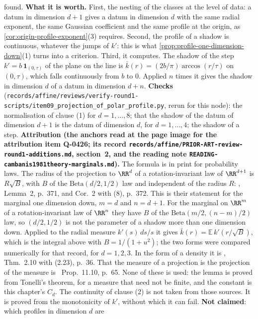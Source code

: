 \begin{lemma}
{found. \textbf{What it is worth.} First, the nesting of the classes at the level of data: a datum
in dimension $d + 1$ gives a datum in dimension $d$ with the same radial exponent, the same
Gaussian coefficient and the same profile at the origin, as
\ref{cor:origin-profile-exponent}(3) requires. Second, the profile of a shadow is continuous,
whatever the jumps of $k'$: this is what \ref{prop:profile-one-dimension-down}(1) turns into a
criterion. Third, it computes. The shadow of the step $k' = b\,\mathbf 1_{(0,\tau)}$ of the plane
on the line is $\bar k(r) = (2b/\pi)\arccos(r/\tau)$ on $(0,\tau)$, which falls continuously from
$b$ to $0$. Applied $n$ times it gives the shadow in dimension $d$ of a datum in dimension
$d + n$. \textbf{Checks}
(\texttt{records/affine/reviews/verify-round1-scripts/item09\_projection\_of\_polar\_profile.py},
rerun for this node): the normalisation of clause (1) for $d = 1,\dots,8$; that the shadow of the
\Matern{} datum of dimension $d + 1$ is the \Matern{} datum of dimension $d$, for
$d = 1,\dots,4$; the shadow of a step. \textbf{Attribution (the anchors read at the page image
for the attribution item Q-0426; its record
\texttt{records/affine/PRIOR-ART-review-round1-additions.md}, section~2, and the reading note
\texttt{READING-cambanis1981theory-marginals.md}).} The formula is in print for
probability laws. The radius of the projection to $\RR^d$ of a rotation-invariant law of
$\RR^{d+1}$ is $R\sqrt{B}$, with $B$ of the $\mathrm{Beta}(d/2, 1/2)$ law and independent of the
radius $R$: , Lemma~2, p.~371, and Cor.~2 with (8), p.~372. This is
their statement for the marginal one dimension down, $m = d$ and $n = d + 1$. For the marginal
on $\RR^m$ of a rotation-invariant law of $\RR^n$ they have $B$ of the
$\mathrm{Beta}(m/2, (n-m)/2)$ law, so $(d/2, 1/2)$ is not the parameter of a shadow more than
one dimension down. Applied to
the radial measure $k'(s)\,ds/s$ it gives $\bar k(r) = \mathbb{E}\,k'(r/\sqrt{B})$, which is the
integral above with $B = 1/(1+u^2)$; the two forms were compared numerically for that record, for
$d = 1, 2, 3$. In the form of a density it is , Thm.~2.10 with (2.23),
p.~36. That the \Levy{} measure of a projection is the projection of the \Levy{} measure is
~Prop.~11.10, p.~65. None of these is used: the lemma is proved from
Tonelli's theorem, for a measure that need not be finite, and the constant is this chapter's
$C_d$. The continuity of clause (2) is not taken from those sources. It is proved from the
monotonicity of $k'$, without which it can fail. \textbf{Not claimed}: which profiles in dimension $d$ are
}
\end{lemma}
